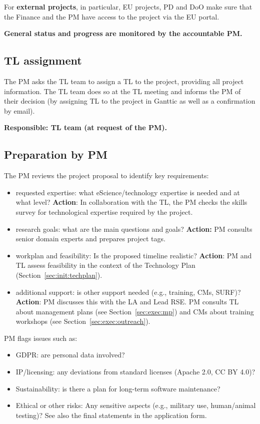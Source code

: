 For \textbf{external projects}, in particular, EU projects, PD and DoO make sure that the Finance and the PM have access to the project via the EU portal.

\textbf{General status and progress are monitored by the accountable PM.}

\subsection{TL assignment}
\label{sec:init:tl-assign}
The PM asks the TL team to assign a TL to the project, providing all project information. The TL team does so at the TL
meeting and informs the PM of their decision (by assigning TL to the project in Ganttic as well as a confirmation by
email). %

\textbf{Responsible: TL team (at request of the PM).}

\subsection{Preparation by PM}
The PM reviews the project proposal to identify key requirements:
\begin{itemize}
\item requested expertise: what eScience/technology expertise is needed and at what level?
\textbf{Action}: In collaboration with the TL, the PM checks the skills survey for technological expertise required by the project.
\item research goals: what are the main questions and goals? \textbf{Action:} PM consults senior domain experts and prepares project tags.
\item workplan and feasibility: Is the proposed timeline realistic? \textbf{Action}: PM and TL assess feasibility in the context of the Technology Plan (Section~\ref{sec:init:techplan}).
\item additional support: is other support needed (e.g., training, CMs, SURF)? \textbf{Action}: PM discusses this with the LA and Lead RSE. PM consults TL about management plans (see Section~\ref{sec:exec:mp}) and CMs about training workshops (see
Section~\ref{sec:exec:outreach}).
\end{itemize}
PM flags issues such as:
\begin{itemize}
\item GDPR: are personal data involved?
\item IP/licensing: any deviations from standard licenses (Apache 2.0, CC BY 4.0)? 
\item Sustainability: is there a plan for long-term software maintenance?
\item Ethical or other risks: Any sensitive aspects (e.g., military use, human/animal testing)? See also the final statements in the application form.
\end{itemize}

